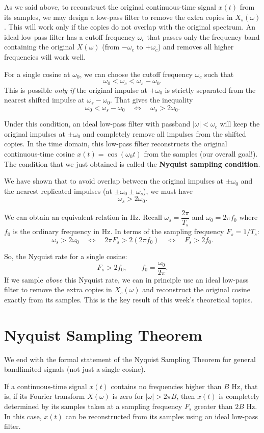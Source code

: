 As we said above, to reconstruct the original continuous-time signal $x(t)$ from its samples, we may design a low-pass filter to remove the extra copies in $X_s(\omega)$. This will work only if the copies do not overlap with the original spectrum. An ideal low-pass filter has a cutoff frequency $\omega_c$ that passes only the frequency band containing the original $X(\omega)$ (from $-\omega_c$ to $+\omega_c$) and removes all higher frequencies will work well.

For a single cosine at $\omega_0$, we can choose the cutoff frequency $\omega_c$ such that
\[
\omega_0 < \omega_c < \omega_s - \omega_0.
\]
This is possible \emph{only if} the original impulse at $+\omega_0$ is strictly
separated from the nearest shifted impulse at $\omega_s - \omega_0$. That gives the
inequality
\[
\omega_0 < \omega_s - \omega_0
\quad \Longleftrightarrow \quad
\omega_s > 2\omega_0.
\]

Under this condition, an ideal low-pass filter with passband
$|\omega| < \omega_c$ will keep the original impulses at $\pm\omega_0$ and completely remove all impulses from the shifted copies.
In the time domain, this low-pass filter reconstructs the original continuous-time cosine
$x(t) = \cos(\omega_0 t)$ from the samples (our overall goal!). The condition that we just obtained is called the \textbf{Nyquist sampling condition}.

We have shown that to avoid overlap between the original impulses at $\pm\omega_0$
and the nearest replicated impulses (at $\pm\omega_0 \pm \omega_s$), we must have
\[
\omega_s > 2\omega_0.
\]

We can obtain an equivalent relation in Hz. Recall $\omega_s = \dfrac{2\pi}{T_s}$ and $\omega_0 = 2\pi f_0$ where $f_0$ is the
ordinary frequency in Hz. In terms of the sampling frequency $F_s = 1/T_s$:
\[
\omega_s > 2\omega_0
\quad\Longleftrightarrow\quad
2\pi F_s > 2(2\pi f_0)
\quad\Longleftrightarrow\quad
F_s > 2f_0.
\]

So, the Nyquist rate for a single cosine:
\[
F_s > 2f_0, \qquad f_0 = \frac{\omega_0}{2\pi}.
\]
If we sample \emph{above} this Nyquist rate, we can in principle use an ideal
low-pass filter to remove the extra copies in $X_s(\omega)$ and reconstruct the
original cosine exactly from its samples. This is the key result of this week's theoretical topics.

\section{Nyquist Sampling Theorem}
We end with the formal statement of the Nyquist Sampling Theorem for general bandlimited signals (not just a single cosine).
\begin{theorem}
If a continuous-time signal $x(t)$ contains no frequencies higher than
$B$ Hz, that is, if its Fourier transform $X(\omega)$ is zero for
$|\omega| > 2\pi B$, then $x(t)$ is completely determined by its samples
taken at a sampling frequency $F_s$ greater than $2B$ Hz. In this case,
$x(t)$ can be reconstructed from its samples using an ideal low-pass filter. 
\end{theorem}

